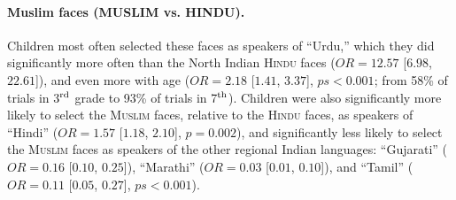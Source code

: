 \documentclass{foushee-adapted-preprint}
\begin{document}
\paragraph{Muslim faces {(M{\small{USLIM}} vs. H{\small{INDU}})}.} 
Children most often selected these faces as speakers of ``Urdu,'' which they did significantly more often than the North Indian \textsc{Hindu} faces ($OR=12.57$ [$6.98$, $22.61$]), and even more with age ($OR=2.18$ [$1.41$, $3.37$], $ps<0.001$; from 58\% of trials in 3$^{\textnormal{rd}}$ grade to 93\% of trials in 7$^{\textnormal{th}}$). 
Children were also significantly more likely to select the \textsc{Muslim} faces, relative to the \textsc{Hindu} faces, as speakers of ``Hindi'' ($OR=1.57$ [$1.18$, $2.10$], $p=0.002$), and significantly less likely to select the \textsc{Muslim} faces as speakers of the other regional Indian languages: ``Gujarati'' ($OR=0.16$ [$0.10$, $0.25$]), ``Marathi'' ($OR=0.03$ [$0.01$, $0.10$]), and ``Tamil'' ($OR=0.11$ [$0.05$, $0.27$], $ps<0.001$).
\end{document}
